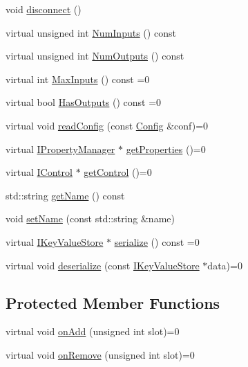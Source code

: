 \begin{DoxyCompactItemize}
\item 
void \hyperlink{classmaudio_1_1Node_ab26d293b4a4da29bae7c2303d37ea9ad}{disconnect} ()
\item 
virtual unsigned int \hyperlink{classmaudio_1_1Node_aa388047f9fd7356e1555d481ce39284e}{Num\-Inputs} () const 
\item 
virtual unsigned int \hyperlink{classmaudio_1_1Node_a1a8c27fc95cf959d243a76351383071d}{Num\-Outputs} () const 
\item 
virtual int \hyperlink{classmaudio_1_1Node_a2d3df13430b6ee1ba1a08a2bfc04d092}{Max\-Inputs} () const =0
\item 
virtual bool \hyperlink{classmaudio_1_1Node_adefc8b35c3242b11730071d72dd8cf83}{Has\-Outputs} () const =0
\item 
virtual void \hyperlink{classmaudio_1_1Node_aab5537a1cda3ec0db8c7a91545066197}{read\-Config} (const \hyperlink{classmaudio_1_1Config}{Config} \&conf)=0
\item 
virtual \hyperlink{classmaudio_1_1IPropertyManager}{I\-Property\-Manager} $\ast$ \hyperlink{classmaudio_1_1Node_ac9960215fa9c0201f1fc31f4f206036c}{get\-Properties} ()=0
\item 
virtual \hyperlink{classmaudio_1_1IControl}{I\-Control} $\ast$ \hyperlink{classmaudio_1_1Node_a4cf6cb717e8811c64bc018bae9248b9f}{get\-Control} ()=0
\item 
std\-::string \hyperlink{classmaudio_1_1Node_acb00c66166f4c0b409e18b1014bcf2e5}{get\-Name} () const 
\item 
void \hyperlink{classmaudio_1_1Node_a63c854dc748dd1f7bafa51f502699774}{set\-Name} (const std\-::string \&name)
\item 
virtual \hyperlink{classmaudio_1_1IKeyValueStore}{I\-Key\-Value\-Store} $\ast$ \hyperlink{classmaudio_1_1Node_a264737e69763b0aa28277c52a772a14f}{serialize} () const =0
\item 
virtual void \hyperlink{classmaudio_1_1Node_af6be2a9f71d265bdbd5a230a58c8138c}{deserialize} (const \hyperlink{classmaudio_1_1IKeyValueStore}{I\-Key\-Value\-Store} $\ast$data)=0
\end{DoxyCompactItemize}
\subsection*{Protected Member Functions}
\begin{DoxyCompactItemize}
\item 
virtual void \hyperlink{classmaudio_1_1Node_aef1bcd3c5642c86495259b638ab54290}{on\-Add} (unsigned int slot)=0
\item 
virtual void \hyperlink{classmaudio_1_1Node_a058346c2dddf4e1cb061fadbd433446e}{on\-Remove} (unsigned int slot)=0
\end{DoxyCompactItemize}
